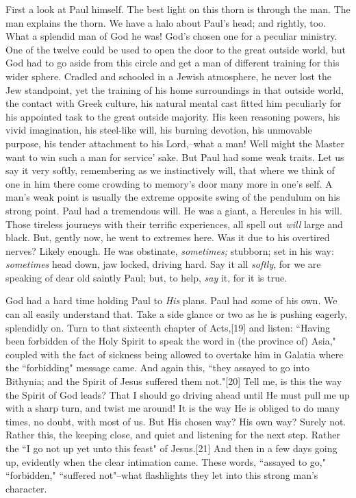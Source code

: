 First a look at Paul himself. The best light on this thorn is through the
man. The man explains the thorn. We have a halo about Paul's head; and
rightly, too. What a splendid man of God he was! God's chosen one for a
peculiar ministry. One of the twelve could be used to open the door to the
great outside world, but God had to go aside from this circle and get a
man of different training for this wider sphere. Cradled and schooled in a
Jewish atmosphere, he never lost the Jew standpoint, yet the training of
his home surroundings in that outside world, the contact with Greek
culture, his natural mental cast fitted him peculiarly for his appointed
task to the great outside majority. His keen reasoning powers, his vivid
imagination, his steel-like will, his burning devotion, his unmovable
purpose, his tender attachment to his Lord,--what a man! Well might the
Master want to win such a man for service' sake. But Paul had some weak
traits. Let us say it very softly, remembering as we instinctively will,
that where we think of one in him there come crowding to memory's door
many more in one's self. A man's weak point is usually the extreme
opposite swing of the pendulum on his strong point. Paul had a tremendous
will. He was a giant, a Hercules in his will. Those tireless journeys with
their terrific experiences, all spell out \textit{will} large and black. But,
gently now, he went to extremes here. Was it due to his overtired nerves?
Likely enough. He was obstinate, \textit{sometimes;} stubborn; set in his way:
\textit{sometimes} head down, jaw locked, driving hard. Say it all \textit{softly}, for
we are speaking of dear old saintly Paul; but, to help, \textit{say} it, for it
is true.

God had a hard time holding Paul to \textit{His} plans. Paul had some of his own.
We can all easily understand that. Take a side glance or two as he is
pushing eagerly, splendidly on. Turn to that sixteenth chapter of
Acts,[19] and listen: ``Having been forbidden of the Holy Spirit to speak
the word in (the province of) Asia," coupled with the fact of sickness
being allowed to overtake him in Galatia where the ``forbidding" message
came. And again this, ``they assayed to go into Bithynia; and the Spirit of
Jesus suffered them not."[20] Tell me, is this the way the Spirit of God
leads? That I should go driving ahead until He must pull me up with a
sharp turn, and twist me around! It is the way He is obliged to do many
times, no doubt, with most of us. But His chosen way? His own way? Surely
not. Rather this, the keeping close, and quiet and listening for the next
step. Rather the ``I go not up yet unto this feast" of Jesus.[21] And then
in a few days going up, evidently when the clear intimation came. These
words, ``assayed to go," ``forbidden," ``suffered not"--what flashlights they
let into this strong man's character.

